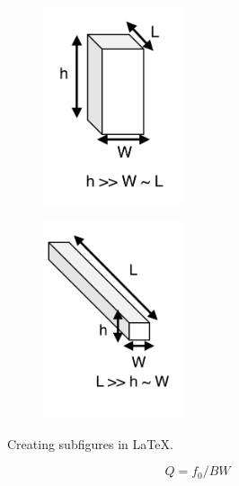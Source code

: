 \begin{figure}
\begin{subfigure}[][][b]{0.3\textwidth}
      \label{fig:ch2_cillinder}
  \end{subfigure}
  \begin{subfigure}[][][b]{0.3\textwidth}
      \includegraphics[width=0.45\textwidth]{Chapters/Figures/Ch2_UltrasoundFundamentals/pillar_piezo.pdf}
      \label{fig:ch2_pillar}
  \end{subfigure}
  \begin{subfigure}[][][b]{0.3\textwidth}
      \includegraphics[width=0.45\textwidth]{Chapters/Figures/Ch2_UltrasoundFundamentals/horiz_pillar_piezo.pdf}
      \label{fig:ch2_h_pillar}
  \end{subfigure}

  \caption{Creating subfigures in \LaTeX.}
  \label{fig:ch2_bvd_model_and_transducer_types}
\end{figure}



\begin{equation}
  Q = f_0 / BW
  \label{eq:q_factor}
\end{equation}



